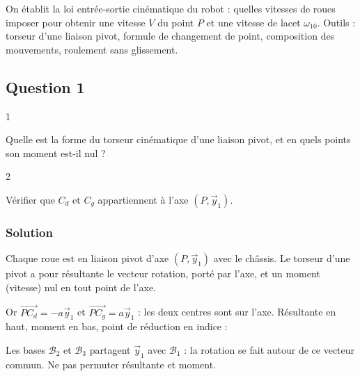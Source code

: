 \documentclass[11pt,a4paper]{article}
\newcommand{\equationajustee}[1]{%
  \sbox{\boiteequation}{$\displaystyle #1$}%
  \ifdim\wd\boiteequation>\linewidth
    \[\resizebox{\linewidth}{!}{\usebox{\boiteequation}}\]%
  \else
    \[#1\]%
  \fi}
\begin{document}
On établit la loi entrée-sortie cinématique du robot : quelles vitesses de roues imposer pour obtenir une vitesse \(V\) du point \(P\) et une vitesse de lacet \(\omega_{10}\). Outils : torseur d'une liaison pivot, formule de changement de point, composition des mouvements, roulement sans glissement.

\hypertarget{question-1}{%
\subsection{Question 1}\label{question-1}}

\begin{indication}{1}

Quelle est la forme du torseur cinématique d'une liaison pivot, et en quels points son moment est-il nul ?

\end{indication}

\begin{indication}{2}

Vérifier que \(C_d\) et \(C_g\) appartiennent à l'axe \((P,\vec y_1)\).

\end{indication}

\hypertarget{solution}{%
\subsubsection{Solution}\label{solution}}

Chaque roue est en liaison pivot d'axe \((P,\vec y_1)\) avec le châssis. Le torseur d'une pivot a pour résultante le vecteur rotation, porté par l'axe, et un moment (vitesse) nul en tout point de l'axe.

Or \(\overrightarrow{PC_d} = -a\vec y_1\) et \(\overrightarrow{PC_g} = a\vec y_1\) : les deux centres sont sur l'axe. Résultante en haut, moment en bas, point de réduction en indice :

\equationajustee{\boxed{\{\mathcal V_{2/1}\} = \left\{\begin{matrix}\omega_{21}\,\vec y_1\\ \vec 0\end{matrix}\right\}_{C_d}}}

\equationajustee{\boxed{\{\mathcal V_{3/1}\} = \left\{\begin{matrix}\omega_{31}\,\vec y_1\\ \vec 0\end{matrix}\right\}_{C_g}}}

\begin{piege}

Les bases \(\mathcal B_2\) et \(\mathcal B_3\) partagent \(\vec y_1\) avec \(\mathcal B_1\) : la rotation se fait autour de ce vecteur commun. Ne pas permuter résultante et moment.

\end{piege}
\end{document}

